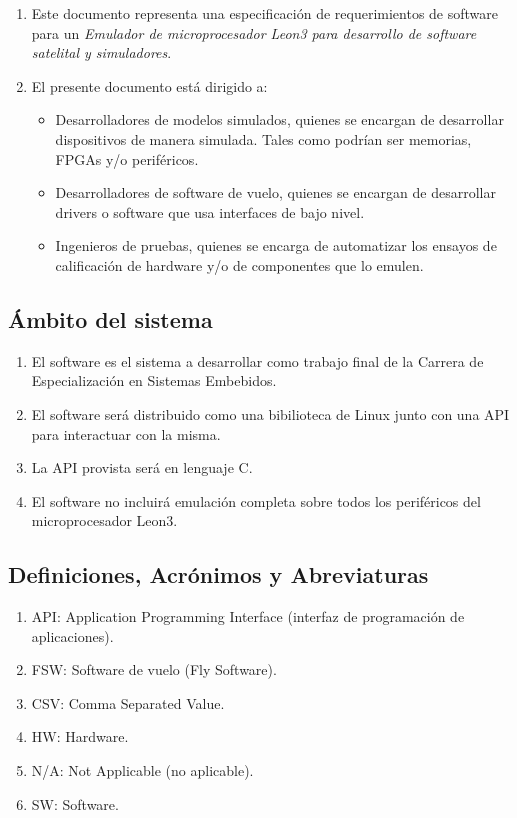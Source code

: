 \documentclass[
  11pt, %
  codirector, %
]{charter}
\begin{document}
\begin{enumerate}
\item Este documento representa una especificación de requerimientos de software para un \textit{Emulador de microprocesador Leon3 para desarrollo de software satelital y simuladores}.

\item El presente documento está dirigido a:

  \begin{itemize}
  \item Desarrolladores de modelos simulados, quienes se encargan de desarrollar dispositivos de manera simulada.  Tales como podrían ser memorias, FPGAs y/o periféricos.

  \item Desarrolladores de software de vuelo, quienes se encargan de desarrollar drivers o software que usa interfaces de bajo nivel.

  \item Ingenieros de pruebas, quienes se encarga de automatizar los    ensayos de calificación de hardware y/o de componentes que lo emulen.
  \end{itemize}

\end{enumerate}


\subsection{Ámbito del sistema}
\label{sec:org12e44a1}

\begin{enumerate}
\item El software es el sistema a desarrollar como trabajo final de la Carrera de Especialización en Sistemas Embebidos.
\item El software será distribuido como una bibilioteca de Linux junto con una API para interactuar con la misma.
\item La API provista será en lenguaje C.
\item El software no incluirá emulación completa sobre todos los periféricos del microprocesador Leon3.
\end{enumerate}


\subsection{Definiciones, Acrónimos y Abreviaturas}
\label{sec:orgb158e36}

\begin{enumerate}
\item API: Application Programming Interface (interfaz de programación de aplicaciones).
\item FSW: Software de vuelo (Fly Software).
\item CSV: Comma Separated Value.
\item HW: Hardware.
\item N/A: Not Applicable (no aplicable).
\item SW: Software.
\end{enumerate}
\end{document}
